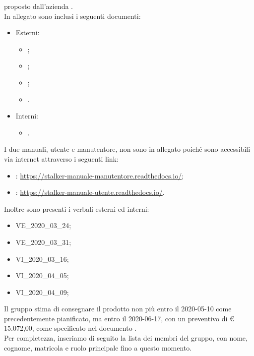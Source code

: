 \documentclass[12pt]{letter}
\begin{document}
\begin{letter}
        proposto dall'azienda \textbf{\Proponente{}}.\\
        In allegato sono inclusi i seguenti documenti:
        \begin{itemize}
            \item Esterni:
            \begin{itemize}
                \item {};
                \item {};
                \item {};
                \item {}.
            \end{itemize}
            \item Interni:
            \begin{itemize}
                \item {}.
            \end{itemize}
        \end{itemize}
        I due manuali, utente e manutentore, non sono in allegato poiché sono accessibili via internet attraverso i seguenti link:
        \begin{itemize}
            \item {}: \href{https://stalker-manuale-manutentore.readthedocs.io/}{https://stalker-manuale-manutentore.readthedocs.io/};
            \item {}: \href{https://stalker-manuale-utente.readthedocs.io/}{https://stalker-manuale-utente.readthedocs.io/}.
        \end{itemize}
        Inoltre sono presenti i verbali esterni ed interni:
        \begin{itemize}
            \item VE\_2020\_03\_24;
            \item VE\_2020\_03\_31;
            \item VI\_2020\_03\_16;
            \item VI\_2020\_04\_05;
            \item VI\_2020\_04\_09;
        \end{itemize}
        Il gruppo stima di consegnare il prodotto non più entro il 2020-05-10 come precedentemente pianificato, ma entro il 2020-06-17, con un preventivo di \euro{} 15.072,00, come specificato nel documento \PdP{}.\\
        Per completezza, inseriamo di seguito la lista dei membri del gruppo, con nome, cognome, matricola e ruolo principale fino a questo momento.

\end{letter}
\end{document}
